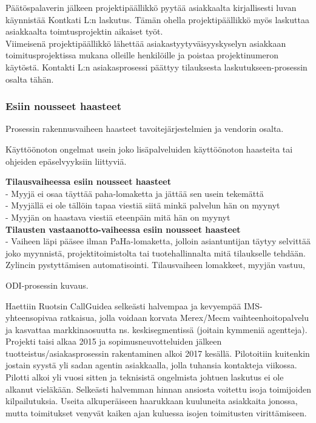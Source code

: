 \documentclass[finnish,12pt,a4paper,pdftex]{article}
\begin{document}
Päätöspalaverin jälkeen projektipäällikkö pyytää asiakkaalta kirjallisesti luvan käynnistää Kontkati L:n laskutus. Tämän ohella projektipäällikkö myös laskuttaa asiakkaalta toimtusprojektin aikaiset työt.\\

Viimeisenä projektipäällikkö lähettää asiakastyytyväisyyskyselyn asiakkaan toimitusprojektissa mukana olleille henkilöille ja poistaa projektinumeron käytöstä. Kontakti L:n asiakasprosessi päättyy tilauksesta laskutukseen-prosessin osalta tähän.\\

\subsubsection{Esiin nousseet haasteet}

Prosessin rakennusvaiheen haasteet tavoitejärjestelmien ja vendorin osalta.


Käyttöönoton ongelmat usein joko lisäpalveluiden käyttöönoton haasteita tai ohjeiden epäselvyyksiin liittyviä. 


\textbf{Tilausvaiheessa esiin nousseet haasteet}\\

- Myyjä ei osaa täyttää paha-lomaketta ja jättää sen usein tekemättä\\
- Myyjällä ei ole tällöin tapaa viestiä siitä minkä palvelun hän on myynyt\\
- Myyjän on haastava viestiä eteenpäin mitä hän on myynyt\\

\textbf{Tilausten vastaanotto-vaiheessa esiin nousseet haasteet}\\

- Vaiheen läpi pääsee ilman PaHa-lomaketta, jolloin asiantuntijan täytyy selvittää joko myynnistä, projektitoimistolta tai tuotehallinnalta mitä tilaukselle tehdään.\\

Zylincin pystyttämisen automatisointi. Tilausvaiheen lomakkeet, myyjän vastuu, 

ODI-prosessin kuvaus.

Haettiin Ruotsin CallGuidea selkeästi halvempaa ja kevyempää IMS-yhteensopivaa ratkaisua, jolla voidaan korvata Merex/Mecm vaihteenhoitopalvelu ja kasvattaa markkinaosuutta ns. keskisegmentissä (joitain kymmeniä agentteja). Projekti taisi alkaa 2015 ja sopimusneuvotteluiden jälkeen tuotteistus/asiakasprosessin rakentaminen alkoi 2017 kesällä. Pilotoitiin kuitenkin jostain syystä yli sadan agentin asiakkaalla, jolla tuhansia kontakteja viikossa. Pilotti alkoi yli vuosi sitten ja teknisistä ongelmista johtuen laskutus ei ole alkanut vieläkään. Selkeästi halvemman hinnan ansiosta voitettu isoja toimijoiden kilpailutuksia. Useita alkuperäiseen haarukkaan kuuluneita asiakkaita jonossa, mutta toimitukset venyvät kaiken ajan kuluessa isojen toimitusten virittämiseen.
\end{document}
